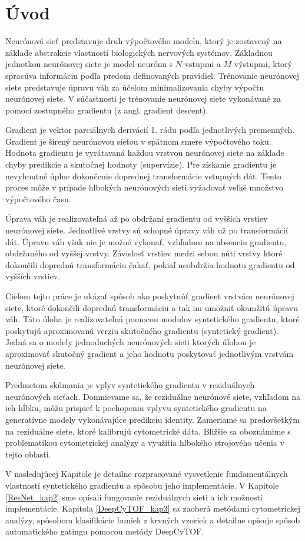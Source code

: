 \chapter*{Úvod} %

Neurónová sieť predstavuje druh výpočtového modelu, ktorý je zostavený na základe abstrakcie vlastností biologických nervových systémov. Základnou jednotkou neurónovej siete je model neurónu s $N$ vstupmi a $M$ výstupmi, ktorý spracúva informáciu podľa predom definovaných pravidiel. Trénovanie neurónovej siete predstavuje úpravu váh za účelom minimalizovania chyby výpočtu neurónovej siete. V súčastnosti je trénovanie neurónovej siete vykonávané za pomoci zostupného gradientu (z angl. gradient descent). %

Gradient je vektor parciálnych derivácií 1. rádu podľa jednotlivých premenných. Gradient je šírený neurónovou sieťou v spätnom smere výpočtového toku. Hodnota gradientu je vyrátavaná každou vrstvou neurónovej siete na základe chyby predikcie a skutočnej hodnoty (supervízie). Pre získanie gradientu je nevyhnutné úplne dokončenie doprednej transformácie vstupných dát. Tento proces môže v prípade hlbokých neurónových sieti vyžadovať veľké množstvo výpočtového času. 

Úprava váh je realizovateľná až po obdržaní gradientu od vyšších vrstiev neurónovej siete. Jednotlivé vrstvy sú schopné úpravy váh už po transformácií dát. Úpravu váh však nie je možné vykonať, vzhľadom na absenciu gradientu, obdržaného od vyššej vrstvy. Závislosť vrstiev medzi sebou núti vrstvy ktoré dokončili doprednú transformáciu čakať, pokiaľ neobdržia hodnotu gradientu od vyšších vrstiev.

Cieľom tejto práce je ukázať spôsob ako poskytnúť gradient vrstvám neurónovej siete, ktoré dokončili
doprednú transformáciu a tak im umožniť okamžitú úpravu váh. Táto úloha je realizovateľná pomocou modulov syntetického gradientu, ktoré poskytujú aproximovanú verziu skutočného gradientu (syntetický gradient). Jedná sa o modely jednoduchých neurónových sieti ktorých úlohou je aproximovať skutočný gradient a jeho hodnotu poskytovať jednotlivým vrstvám neurónovej siete. 

Predmetom skúmania je vplyv syntetického gradientu v reziduálnych neurónových sieťach. Domnievame sa, že reziduálne neurónové siete, vzhľadom na ich hĺbku, môžu prispieť k pochopeniu vplyvu syntetického gradientu na generatívne modely vykonávajúce predikciu identity. Zameriame sa predovšetkým na reziduálne siete, ktoré kalibrujú cytometrické dáta. Bližšie sa oboznámime s problematikou cytometrickej analýzy a využitia hlbokého strojového učenia v tejto oblasti.

V nasledujúcej Kapitole je detailne rozpracované vysvetlenie fundamentálnych vlastností syntetického gradientu a spôsobu jeho implementácie. V Kapitole \ref{ResNet_kap2} sme opísali fungovanie reziduálnych sieti a ich možnosti implementácie. Kapitola \ref{DeepCyTOF_kap3} sa zaoberá metódami cytometrickej analýzy, spôsobom klasifikácie buniek z krvných vzoriek a detailne opisuje spôsob automatického gatingu pomocou metódy DeepCyTOF.
